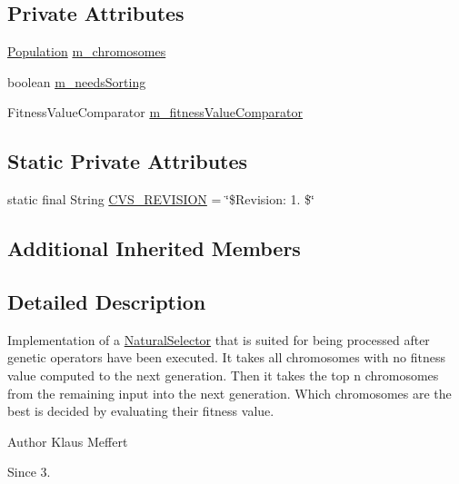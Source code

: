 \subsection*{Private Attributes}
\begin{DoxyCompactItemize}
\item 
\hyperlink{classorg_1_1jgap_1_1_population}{Population} \hyperlink{classorg_1_1jgap_1_1impl_1_1_standard_post_selector_a39fe9580f3b6623f01543e682947f405}{m\-\_\-chromosomes}
\item 
boolean \hyperlink{classorg_1_1jgap_1_1impl_1_1_standard_post_selector_aed2e8ed51df6a2317a2be6cbd7b406e9}{m\-\_\-needs\-Sorting}
\item 
Fitness\-Value\-Comparator \hyperlink{classorg_1_1jgap_1_1impl_1_1_standard_post_selector_a979669fdbcfd1a4b0a0281de93cf734b}{m\-\_\-fitness\-Value\-Comparator}
\end{DoxyCompactItemize}
\subsection*{Static Private Attributes}
\begin{DoxyCompactItemize}
\item 
static final String \hyperlink{classorg_1_1jgap_1_1impl_1_1_standard_post_selector_a9fffa9608614f556a964a06de12d9641}{C\-V\-S\-\_\-\-R\-E\-V\-I\-S\-I\-O\-N} = \char`\"{}\$Revision\-: 1. \$\char`\"{}
\end{DoxyCompactItemize}
\subsection*{Additional Inherited Members}


\subsection{Detailed Description}
Implementation of a \hyperlink{classorg_1_1jgap_1_1_natural_selector}{Natural\-Selector} that is suited for being processed after genetic operators have been executed. It takes all chromosomes with no fitness value computed to the next generation. Then it takes the top n chromosomes from the remaining input into the next generation. Which chromosomes are the best is decided by evaluating their fitness value.

\begin{DoxyAuthor}{Author}
Klaus Meffert 
\end{DoxyAuthor}
\begin{DoxySince}{Since}
3. 
\end{DoxySince}


